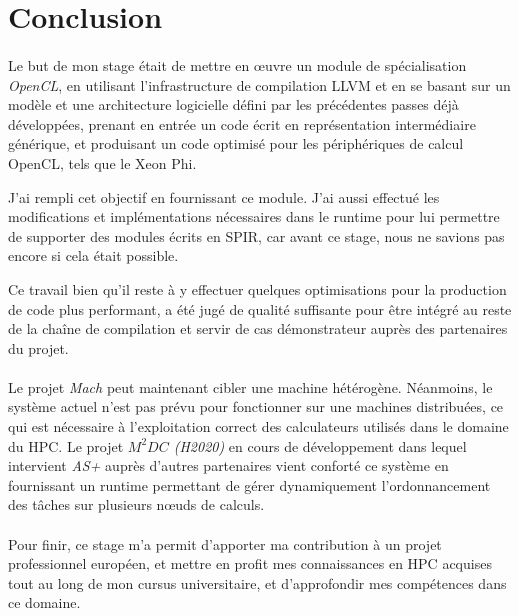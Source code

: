 \section{Conclusion}
\paragraph{}
Le but de mon stage était de mettre en \oe{}uvre un module de spécialisation
\emph{OpenCL}, en utilisant l'infrastructure de compilation LLVM et en se basant
sur un modèle et une architecture logicielle défini par les précédentes passes
déjà développées, prenant en entrée un code écrit en représentation
intermédiaire générique, et produisant un code optimisé pour les périphériques
de calcul OpenCL, tels que le Xeon Phi.

J’ai rempli cet objectif en fournissant ce module. J'ai aussi effectué les
modifications et implémentations nécessaires dans le runtime pour lui permettre
de supporter des modules écrits en SPIR, car avant ce stage, nous ne savions pas
encore si cela était possible.

Ce travail bien qu'il reste à y effectuer quelques optimisations pour la
production de code plus performant, a été jugé de qualité suffisante pour être
intégré au reste de la chaîne de compilation et servir de cas démonstrateur
auprès des partenaires du projet.

\paragraph{}
Le projet \emph{Mach} peut maintenant cibler une machine hétérogène. Néanmoins,
le système actuel n'est pas prévu pour fonctionner sur une machines distribuées,
ce qui est nécessaire à l'exploitation correct des calculateurs utilisés dans le
domaine du HPC. Le projet \emph{$M^2DC$ (H2020)} en cours de développement dans
lequel intervient \emph{AS+} auprès d'autres partenaires vient conforté ce
système en fournissant un runtime permettant de gérer dynamiquement
l'ordonnancement des tâches sur plusieurs n\oe{}uds de calculs.

\paragraph{}
Pour finir, ce stage m'a permit d'apporter ma contribution à un projet
professionnel européen, et mettre en profit mes connaissances en HPC acquises
tout au long de mon cursus universitaire, et d'approfondir mes compétences dans
ce domaine.
